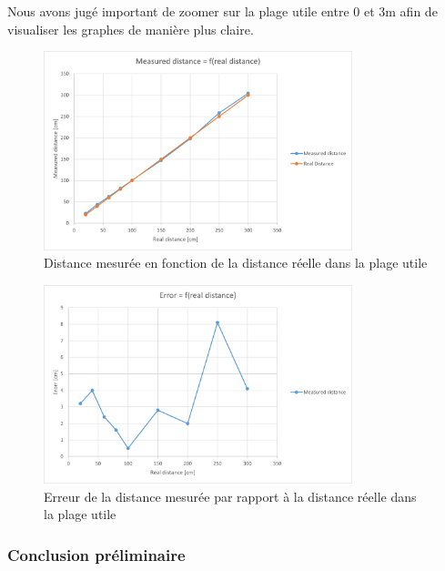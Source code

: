 Nous avons jugé important de zoomer sur la plage utile entre 0 et 3m afin de visualiser les graphes 
de manière plus claire.

\begin{figure}[H]
    \centering
    \includegraphics[width=0.8\textwidth]{Images/LiDAR/LiDARRealDistanceGraph_MesDist_Zoom.png}
    \caption{Distance mesurée en fonction de la distance réelle dans la plage utile}
    \label{fig:RealDistanceMesGraphZoom}
\end{figure}

\begin{figure}[H]
    \centering
    \includegraphics[width=0.8\textwidth]{Images/LiDAR/LiDARRealDistanceGraph_MesDistError_Zoom.png}
    \caption{Erreur de la distance mesurée par rapport à la distance réelle dans la plage utile}
    \label{fig:RealDistanceMesGraphErrorZoom}
\end{figure}

\subsubsection{Conclusion préliminaire}

